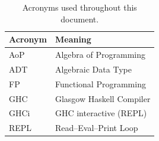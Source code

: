 \begin{table}[h]
\centering
\begin{tabular}{ll}
\toprule
\textbf{Acronym} & \textbf{Meaning} \\
\midrule
AoP  & Algebra of Programming \\
ADT  & Algebraic Data Type \\
FP   & Functional Programming \\
GHC  & Glasgow Haskell Compiler \\
GHCi & GHC interactive (REPL) \\
REPL & Read--Eval--Print Loop \\
\bottomrule
\end{tabular}
\caption{Acronyms used throughout this document.}
\label{tab:acronyms}
\end{table}

\newpage
